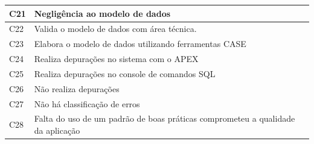 \begin{longtable}{|M{1.3cm} | m{14.0cm}|}
C21            & Negligência ao modelo de dados                                                                                                                                                                                                                                    \\ \hline
C22            & Valida o modelo de dados com área técnica.                                                                                                                                                                                                                        \\ \hline
C23            & Elabora o modelo de dados utilizando ferramentas CASE                                                                                                                                                                                                             \\ \hline
C24            & Realiza depurações no sistema com o APEX                                                                                                                                                                                                                          \\ \hline
C25            & Realiza depurações no console de comandos SQL                                                                                                                                                                                                                     \\ \hline
C26            & Não realiza depurações                                                                                                                                                                                                                                            \\ \hline
C27            & Não há classificação de erros                                                                                                                                                                                                                                     \\ \hline
C28            & Falta do uso de um padrão de boas práticas comprometeu a qualidade da aplicação                                                                                                                                                                                   \\ \hline

\end{longtable}
